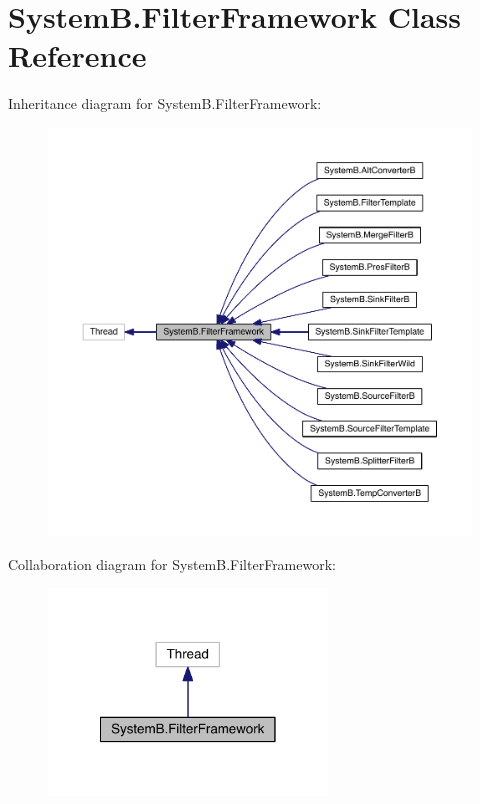 \hypertarget{class_system_b_1_1_filter_framework}{}\section{System\+B.\+Filter\+Framework Class Reference}
\label{class_system_b_1_1_filter_framework}


Inheritance diagram for System\+B.\+Filter\+Framework\+:
\nopagebreak
\begin{figure}[H]
\begin{center}
\leavevmode
\includegraphics[width=350pt]{class_system_b_1_1_filter_framework__inherit__graph}
\end{center}
\end{figure}


Collaboration diagram for System\+B.\+Filter\+Framework\+:
\nopagebreak
\begin{figure}[H]
\begin{center}
\leavevmode
\includegraphics[width=210pt]{class_system_b_1_1_filter_framework__coll__graph}
\end{center}
\end{figure}

